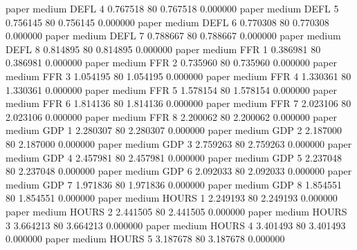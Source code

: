          paper     medium     DEFL                 4  0.767518 80       0.767518           0.000000
         paper     medium     DEFL                 5  0.756145 80       0.756145           0.000000
         paper     medium     DEFL                 6  0.770308 80       0.770308           0.000000
         paper     medium     DEFL                 7  0.788667 80       0.788667           0.000000
         paper     medium     DEFL                 8  0.814895 80       0.814895           0.000000
         paper     medium      FFR                 1  0.386981 80       0.386981           0.000000
         paper     medium      FFR                 2  0.735960 80       0.735960           0.000000
         paper     medium      FFR                 3  1.054195 80       1.054195           0.000000
         paper     medium      FFR                 4  1.330361 80       1.330361           0.000000
         paper     medium      FFR                 5  1.578154 80       1.578154           0.000000
         paper     medium      FFR                 6  1.814136 80       1.814136           0.000000
         paper     medium      FFR                 7  2.023106 80       2.023106           0.000000
         paper     medium      FFR                 8  2.200062 80       2.200062           0.000000
         paper     medium      GDP                 1  2.280307 80       2.280307           0.000000
         paper     medium      GDP                 2  2.187000 80       2.187000           0.000000
         paper     medium      GDP                 3  2.759263 80       2.759263           0.000000
         paper     medium      GDP                 4  2.457981 80       2.457981           0.000000
         paper     medium      GDP                 5  2.237048 80       2.237048           0.000000
         paper     medium      GDP                 6  2.092033 80       2.092033           0.000000
         paper     medium      GDP                 7  1.971836 80       1.971836           0.000000
         paper     medium      GDP                 8  1.854551 80       1.854551           0.000000
         paper     medium    HOURS                 1  2.249193 80       2.249193           0.000000
         paper     medium    HOURS                 2  2.441505 80       2.441505           0.000000
         paper     medium    HOURS                 3  3.664213 80       3.664213           0.000000
         paper     medium    HOURS                 4  3.401493 80       3.401493           0.000000
         paper     medium    HOURS                 5  3.187678 80       3.187678           0.000000
